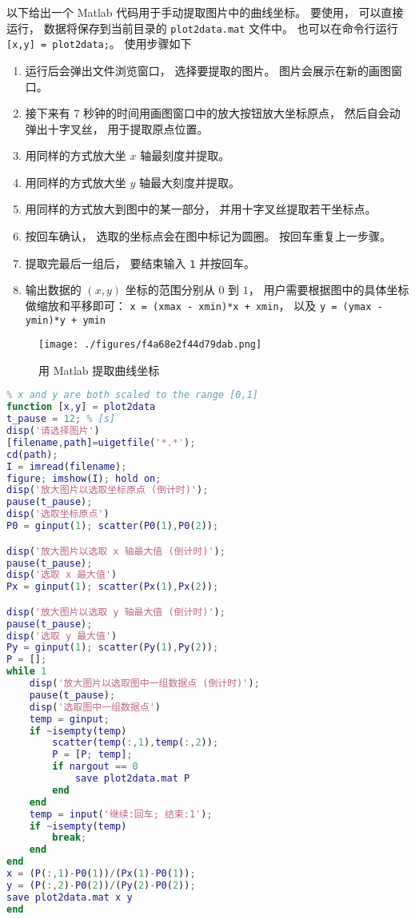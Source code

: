 

以下给出一个 Matlab 代码用于手动提取图片中的曲线坐标。 要使用， 可以直接运行， 数据将保存到当前目录的 \verb`plot2data.mat` 文件中。 也可以在命令行运行 \verb`[x,y] = plot2data;`。 使用步骤如下

\begin{enumerate}
\item 运行后会弹出文件浏览窗口， 选择要提取的图片。 图片会展示在新的画图窗口。
\item 接下来有 7 秒钟的时间用画图窗口中的放大按钮放大坐标原点， 然后自会动弹出十字叉丝， 用于提取原点位置。
\item 用同样的方式放大坐 $x$ 轴最刻度并提取。
\item 用同样的方式放大坐 $y$ 轴最大刻度并提取。
\item 用同样的方式放大到图中的某一部分， 并用十字叉丝提取若干坐标点。
\item 按回车确认， 选取的坐标点会在图中标记为圆圈。 按回车重复上一步骤。
\item 提取完最后一组后， 要结束输入 \verb`1` 并按回车。
\item 输出数据的 $(x, y)$ 坐标的范围分别从 $0$ 到 $1$， 用户需要根据图中的具体坐标做缩放和平移即可： \verb`x = (xmax - xmin)*x + xmin`， 以及 \verb`y = (ymax - ymin)*y + ymin`
\end{enumerate}

\begin{figure}[ht]
\centering
\texttt{[image: ./figures/f4a68e2f44d79dab.png]}
\caption{用 Matlab 提取曲线坐标} \label{fig_plt2xy_1}
\end{figure}

\begin{lstlisting}[language=matlab, caption=plot2data.m]
% Data Extractor for Plot
% x and y are both scaled to the range [0,1]
function [x,y] = plot2data
t_pause = 12; % [s]
disp('请选择图片')
[filename,path]=uigetfile('*.*');
cd(path);
I = imread(filename);
figure; imshow(I); hold on;
disp('放大图片以选取坐标原点 (倒计时)');
pause(t_pause);
disp('选取坐标原点')
P0 = ginput(1); scatter(P0(1),P0(2));

disp('放大图片以选取 x 轴最大值 (倒计时)');
pause(t_pause);
disp('选取 x 最大值')
Px = ginput(1); scatter(Px(1),Px(2));

disp('放大图片以选取 y 轴最大值 (倒计时)');
pause(t_pause);
disp('选取 y 最大值')
Py = ginput(1); scatter(Py(1),Py(2));
P = [];
while 1
    disp('放大图片以选取图中一组数据点 (倒计时)');
    pause(t_pause);
    disp('选取图中一组数据点')
    temp = ginput;
    if ~isempty(temp)
        scatter(temp(:,1),temp(:,2));
        P = [P; temp];
        if nargout == 0
            save plot2data.mat P
        end
    end
    temp = input('继续:回车; 结束:1');
    if ~isempty(temp)
        break;
    end
end
x = (P(:,1)-P0(1))/(Px(1)-P0(1));
y = (P(:,2)-P0(2))/(Py(2)-P0(2));
save plot2data.mat x y
end
\end{lstlisting}

